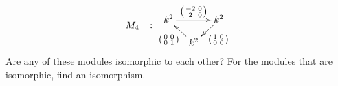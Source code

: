 \documentclass[a4paper]{amsart}
\begin{document}
\begin{Exercise}[title={Isomorphisms}]
\begin{align*}
{{}}
&
M_4&\colon
\vcenter{\xymatrix@C=1em@R=1em{
k^2 \ar[rr]^{\left( \begin{smallmatrix} -2 & 0 \\ 2 & 0 \end{smallmatrix} \right)} &&
k^2 \ar[dl]^{\left( \begin{smallmatrix} 1 & 0 \\ 0 & 0 \end{smallmatrix} \right)} \\
&
k^2 \ar[ul]^{\left( \begin{smallmatrix} 0 & 0 \\ 0 & 1 \end{smallmatrix} \right)}
}}
\end{align*}
\Question Are any of these modules isomorphic to each other?
\Question For the modules that are isomorphic, find an isomorphism.
\end{Exercise}




\end{document}
